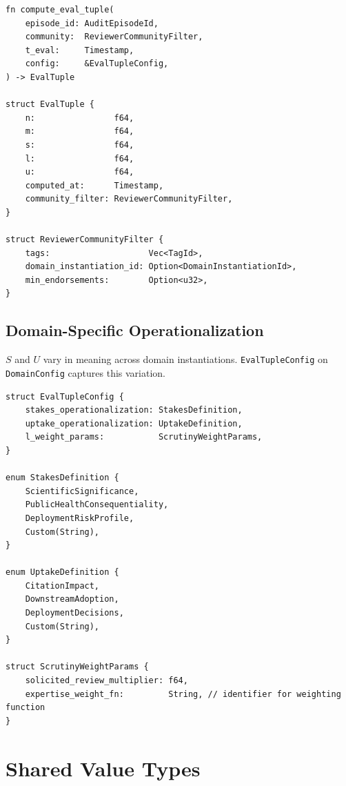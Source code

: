\documentclass[11pt]{article}
\begin{document}
\begin{lstlisting}
fn compute_eval_tuple(
    episode_id: AuditEpisodeId,
    community:  ReviewerCommunityFilter,
    t_eval:     Timestamp,
    config:     &EvalTupleConfig,
) -> EvalTuple

struct EvalTuple {
    n:                f64,
    m:                f64,
    s:                f64,
    l:                f64,
    u:                f64,
    computed_at:      Timestamp,
    community_filter: ReviewerCommunityFilter,
}

struct ReviewerCommunityFilter {
    tags:                    Vec<TagId>,
    domain_instantiation_id: Option<DomainInstantiationId>,
    min_endorsements:        Option<u32>,
}
\end{lstlisting}

\subsection{Domain-Specific Operationalization}

$S$ and $U$ vary in meaning across domain instantiations.
\texttt{EvalTupleConfig} on \texttt{DomainConfig} captures this variation.

\begin{lstlisting}
struct EvalTupleConfig {
    stakes_operationalization: StakesDefinition,
    uptake_operationalization: UptakeDefinition,
    l_weight_params:           ScrutinyWeightParams,
}

enum StakesDefinition {
    ScientificSignificance,
    PublicHealthConsequentiality,
    DeploymentRiskProfile,
    Custom(String),
}

enum UptakeDefinition {
    CitationImpact,
    DownstreamAdoption,
    DeploymentDecisions,
    Custom(String),
}

struct ScrutinyWeightParams {
    solicited_review_multiplier: f64,
    expertise_weight_fn:         String, // identifier for weighting function
}
\end{lstlisting}

\section{Shared Value Types}
\end{document}
